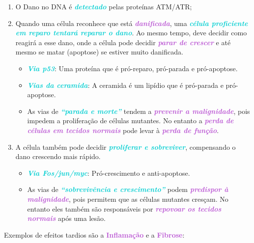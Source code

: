 \documentclass[11pt,a4paper]{article}
\begin{document}
		\begin{enumerate}
			\item O Dano no DNA é \textcolor{DarkTurquoise}{\textbf{\textit{detectado}}} pelas proteínas ATM/ATR;
			\item Quando uma célula reconhece que está \textcolor{MediumOrchid}{\textbf{\textit{danificada}}}, uma \textcolor{DarkTurquoise}{\textbf{\textit{célula proficiente em reparo tentará reparar o dano}}}. Ao mesmo tempo, deve decidir como reagirá a esse dano, onde a célula pode decidir \textcolor{MediumOrchid}{\textbf{\textit{parar de crescer}}} e até mesmo se matar (apoptose) se estiver muito danificada.
				\begin{itemize}
					\item \textcolor{DarkTurquoise}{\textbf{\textit{Via p53}}}: Uma proteína que é pró-reparo, pró-parada e pró-apoptose.
					\item \textcolor{DarkTurquoise}{\textbf{\textit{Vias da ceramida}}}: A ceramida é um lipídio que é pró-parada e pró-apoptose.
					\item As vias de \textcolor{DarkTurquoise}{\textbf{\textit{“parada e morte”}}} tendem a \textcolor{MediumOrchid}{\textbf{\textit{prevenir a malignidade}}}, pois impedem a proliferação de células mutantes. No entanto a \textcolor{MediumOrchid}{\textbf{\textit{perda de células em tecidos normais}}} pode levar à \textcolor{MediumOrchid}{\textbf{\textit{perda de função}}}.
				\end{itemize}
			\item A célula também pode decidir \textcolor{DarkTurquoise}{\textbf{\textit{proliferar e sobreviver}}}, compensando o dano crescendo mais rápido.
				\begin{itemize}
					\item \textcolor{DarkTurquoise}{\textbf{\textit{Via Fos/jun/myc}}}: Pró-crescimento e anti-apoptose.
					\item As vias de \textcolor{DarkTurquoise}{\textbf{\textit{“sobrevivência e crescimento”}}} podem \textcolor{MediumOrchid}{\textbf{\textit{predispor à malignidade}}}, pois permitem que as células mutantes cresçam. No entanto eles também são responsáveis por \textcolor{MediumOrchid}{\textbf{\textit{repovoar os tecidos normais}}} após uma lesão.
				\end{itemize}
		\end{enumerate}

	Exemplos de efeitos tardios são a \textcolor{MediumOrchid}{\LobsterTwo\textbf{Inflamação}} e a \textcolor{MediumOrchid}{\LobsterTwo\textbf{Fibrose}}:
\end{document}
